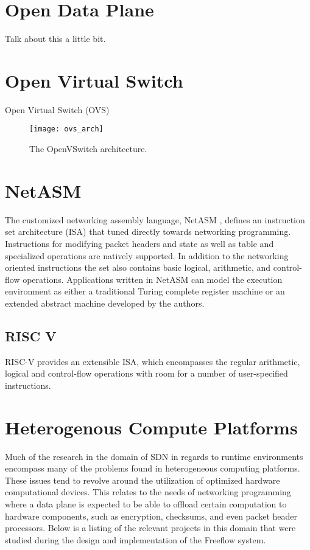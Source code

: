 \section{Open Data Plane}
\label{related:odp}
Talk about this a little bit.

\section{Open Virtual Switch}
\label{related:ovs}
Open Virtual Switch (OVS)
\begin{figure}[h]
\centering
\texttt{[image: ovs\_arch]}
\caption{The OpenVSwitch architecture.}
\label{related:ovs_arch}
\end{figure}

\section{NetASM}
\label{related:netasm}
The customized networking assembly language, NetASM \cite{netasm}, defines an
instruction set architecture (ISA) that tuned directly towards networking
programming. Instructions for modifying packet headers and state as well
as table and specialized operations are natively supported. In addition to the
networking oriented instructions the set also contains basic logical,
arithmetic, and control-flow operations. Applications written in NetASM can model
the execution environment as either a traditional Turing complete register
machine or an extended abstract machine developed by the authors.

\subsection{RISC V}
RISC-V provides an extensible ISA, which encompasses the regular arithmetic,
logical and control-flow operations with room for a number of user-specified
instructions.

\section{Heterogenous Compute Platforms}
\label{related:hcp}
Much of the research in the domain of SDN in regards to runtime environments
encompass many of the problems found in heterogeneous computing platforms.
These issues tend to revolve around the utilization of optimized hardware
computational devices. This relates to the needs of networking programming
where a data plane is expected to be able to offload certain computation to
hardware components, such as encryption, checksums, and even packet header
processors. Below is a listing of the relevant projects in this domain that
were studied during the design and implementation of the Freeflow system.

